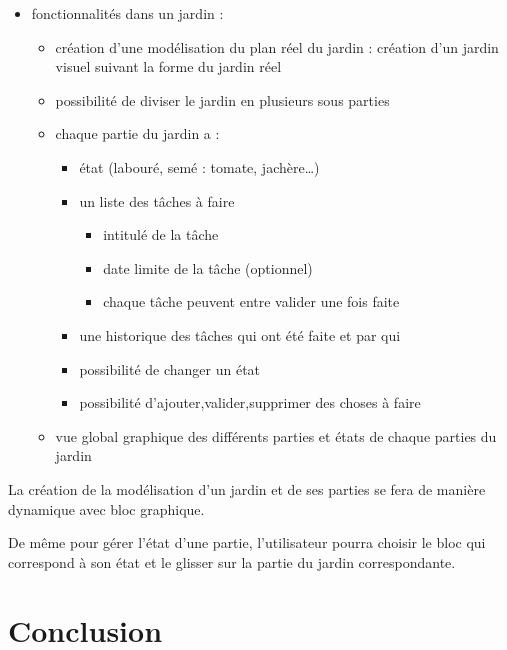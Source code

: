 \documentclass[french,a4paper]{article}
\begin{document}
\begin{itemize}
\begin{itemize}
    \end{itemize}
    \item fonctionnalités dans un jardin :
    \begin{itemize}
        \item création d’une modélisation du plan réel du jardin : création d’un jardin visuel suivant la forme du jardin réel
        \item  possibilité de diviser le jardin en plusieurs sous parties 
        \item chaque partie du jardin a : 
        \begin{itemize}
            \item état (labouré, semé : tomate, jachère…)
            \item un liste des tâches à faire
            \begin{itemize}
                \item intitulé de la tâche
                \item date limite de la tâche (optionnel)
                \item chaque tâche peuvent entre valider une fois faite
            \end{itemize}
            \item une historique des tâches qui ont été faite et par qui
            \item possibilité de changer un état
            \item possibilité d’ajouter,valider,supprimer des choses à faire
        \end{itemize}
        \item vue global graphique des différents parties et états de chaque parties du jardin
    \end{itemize}
\end{itemize}
La création de la modélisation d’un jardin et de ses parties se fera de manière dynamique avec bloc graphique.

De même pour gérer l’état d’une partie, l’utilisateur pourra choisir le bloc qui correspond à son état et le glisser sur la partie du jardin correspondante.

\section{Conclusion}
\end{document}
